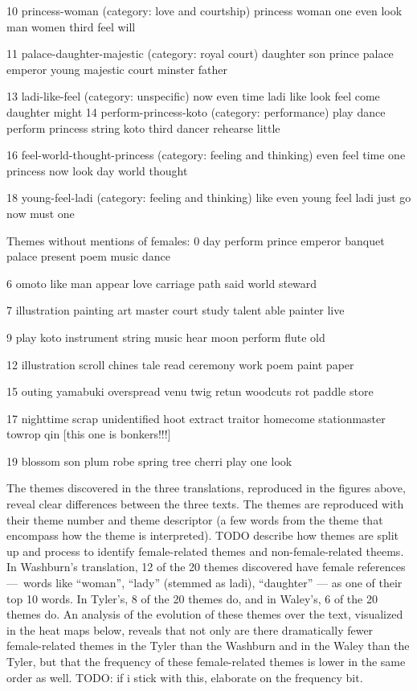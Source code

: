 \documentclass[12pt]{article}
\begin{document}
\begin{flushleft}
\begin{spacing}{2.0}
10 princess-woman (category: love and courtship)
princess woman one even look man women third feel will

11 palace-daughter-majestic (category: royal court)
daughter son prince palace emperor young majestic court minster father

13 ladi-like-feel (category: unspecific)
now even time ladi like look feel come daughter might
14 perform-princess-koto (category: performance)
play dance perform princess string koto third dancer rehearse little

16 feel-world-thought-princess (category: feeling and thinking)
even feel time one princess now look day world thought

18 young-feel-ladi (category: feeling and thinking)
like even young feel ladi just go now must one

Themes without mentions of females:
0 day perform prince emperor banquet palace present poem music dance

6 omoto like man appear love carriage path said world steward

7 illustration painting art master court study talent able painter live

9 play koto instrument string music hear moon perform flute old

12 illustration scroll chines tale read ceremony work poem paint paper

15 outing yamabuki overspread venu twig retun woodcuts rot paddle store

17 nighttime scrap unidentified hoot extract traitor homecome stationmaster towrop qin [this one is bonkers!!!]

19 blossom son plum robe spring tree cherri play one look

The themes discovered in the three translations, reproduced in the figures above, reveal clear differences between the three texts. The themes are reproduced with their theme number and theme descriptor (a few words from the theme that encompass how the theme is interpreted). TODO describe how themes are split up and process to identify female-related themes and non-female-related theems. In Washburn’s translation, 12 of the 20 themes discovered have female references --- words like ``woman'', ``lady'' (stemmed as ladi), ``daughter'' --- as one of their top 10 words. In Tyler’s, 8 of the 20 themes do, and in Waley’s, 6 of the 20 themes do. An analysis of the evolution of these themes over the text, visualized in the heat maps below, reveals that not only are there dramatically fewer female-related themes in the Tyler than the Washburn and in the Waley than the Tyler, but that the frequency of these female-related themes is lower in the same order as well. TODO: if i stick with this, elaborate on the frequency bit.


\end{spacing}
\end{flushleft}
\end{document}
